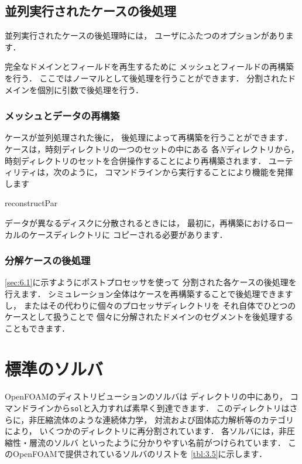 \subsection{並列実行されたケースの後処理}
\label{ssec:3.4.4}
並列実行されたケースの後処理時には，
ユーザにふたつのオプションがあります．

完全なドメインとフィールドを再生するために
メッシュとフィールドの再構築を行う．
ここではノーマルとして後処理を行うことができます．
分割されたドメインを個別に引数で後処理を行う．

\subsubsection{メッシュとデータの再構築}
\label{sssec:3.4.4.1}
ケースが並列処理された後に，
後処理によって再構築を行うことができます．
ケースは，時刻ディレクトリの一つのセットの中にある
各$N$ディレクトリから，
時刻ディレクトリのセットを合併操作することにより再構築されます．
%
%
ユーティリティは，次のように，
コマンドラインから実行することにより機能を発揮します
\begin{OFverbatim}[terminal]
reconstructPar
\end{OFverbatim}
データが異なるディスクに分散されるときには，
最初に，再構築におけるローカルのケースディレクトリに
コピーされる必要があります．

\subsubsection{分解ケースの後処理}
\label{sssec:3.4.4.2}
\autoref{sec:6.1}に示すようにポストプロセッサを使って
分割された各ケースの後処理を行えます．
シミュレーション全体はケースを再構築することで後処理できますし，
またはその代わりに個々のプロセッサディレクトリを
それ自体でひとつのケースとして扱うことで
個々に分解されたドメインのセグメントを後処理することもできます．



\section{標準のソルバ}
\label{sec:3.5}
OpenFOAMのディストリビューションのソルバは
ディレクトリの中にあり，
コマンドラインから\texttt{sol}と入力すれば素早く到達できます．
このディレクトリはさらに，非圧縮流体のような連続体力学，
対流および固体応力解析等のカテゴリにより，
いくつかのディレクトリに再分割されています．
各ソルバには，非圧縮性・層流のソルバ
といったように分かりやすい名前がつけられています．
このOpenFOAMで提供されているソルバのリストを
\autoref{tbl:3.5}に示します．


